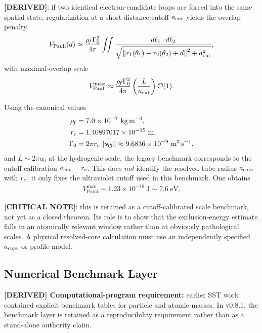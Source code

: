 \textbf{[DERIVED]}: if two identical electron-candidate loops are forced into the same spatial state, regularization at a short-distance cutoff $a_{\rm cut}$ yields the overlap penalty
\begin{align}
    V_{\mathrm{Pauli}}(d)
    \approx
    \frac{\rho_{\!f}\Gamma_0^2}{4\pi}
    \iint
    \frac{d\ell_1\cdot d\ell_2}{\sqrt{\norm{r_1(\theta_1)-r_2(\theta_2)+d}^2+a_{\rm cut}^2}},
\end{align}
with maximal-overlap scale
\begin{align}
    V_{\mathrm{Pauli}}^{\max}
    \approx
    \frac{\rho_{\!f}\Gamma_0^2}{4\pi}\left(\frac{L}{a_{\rm cut}}\right)\mathcal{O}(1).
\end{align}

Using the canonical values
\begin{align}
    \rhoF &= 7.0\times 10^{-7}\ \mathrm{kg\,m^{-3}}, \\
    \rc &= 1.40897017\times 10^{-15}\ \mathrm{m}, \\
    \Gamma_0 &= 2\pi \rc\,\vnorm \approx 9.6836\times 10^{-9}\ \mathrm{m^2\,s^{-1}},
\end{align}
and \(L\sim 2\pi a_0\) at the hydrogenic scale, the legacy benchmark corresponds to the cutoff calibration \(a_{\rm cut}=r_c\). This does \emph{not} identify the resolved tube radius \(a_{\rm core}\) with \(r_c\); it only fixes the ultraviolet cutoff used in this benchmark. One obtains
\begin{align}
    V_{\mathrm{Pauli}}^{\max} \sim 1.23\times 10^{-18}\ \mathrm{J} \sim 7.6\ \mathrm{eV}.
\end{align}

\textbf{[CRITICAL NOTE]}: this is retained as a cutoff-calibrated scale benchmark, not yet as a closed theorem. Its role is to show that the exclusion-energy estimate falls in an atomically relevant window rather than at obviously pathological scales. A physical resolved-core calculation must use an independently specified \(a_{\rm core}\) or profile model.

\subsection{Numerical Benchmark Layer}
\textbf{[DERIVED] Computational-program requirement:} earlier SST work contained explicit benchmark tables for particle and atomic masses. In v0.8.1, the benchmark layer is retained as a reproducibility requirement rather than as a stand-alone authority claim.

